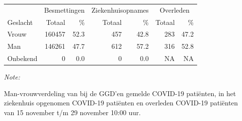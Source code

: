 \documentclass[
  english,
  man,floatsintext]{apa6}
\begin{document}
\begin{table}
\centering\begingroup\fontsize{11}{13}\selectfont

\begin{threeparttable}
\begin{tabular}{lrrrrrr}
\toprule
\multicolumn{1}{c}{ } & \multicolumn{2}{c}{Besmettingen} & \multicolumn{2}{c}{Ziekenhuisopnames} & \multicolumn{2}{c}{Overleden} \\
\cmidrule(l{3pt}r{3pt}){2-3} \cmidrule(l{3pt}r{3pt}){4-5} \cmidrule(l{3pt}r{3pt}){6-7}
Geslacht & Totaal & \% & Totaal & \% & Totaal & \%\\
\midrule
Vrouw & 160457 & 52.3 & 457 & 42.8 & 283 & 47.2\\
Man & 146261 & 47.7 & 612 & 57.2 & 316 & 52.8\\
Onbekend & 0 & 0.0 & 0 & 0.0 & NA & NA\\
\bottomrule
\end{tabular}
\begin{tablenotes}
\item \textit{Note: } 
\item Man-vrouwverdeling van bij de GGD’en gemelde COVID-19 patiënten, in het ziekenhuis opgenomen COVID-19 patiënten en overleden COVID-19 patiënten van 15 november t/m 29 november 10:00 uur.
\end{tablenotes}
\end{threeparttable}
\endgroup{}
\end{table}
\newpage
\end{document}
